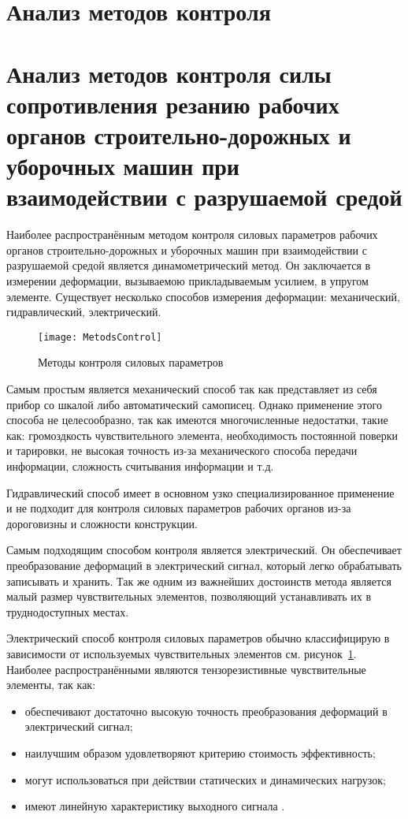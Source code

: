 \section{Анализ методов контроля}
\section{Анализ методов контроля силы сопротивления резанию рабочих органов строительно-дорожных и уборочных машин при взаимодействии с разрушаемой средой}
Наиболее распространённым методом контроля силовых параметров рабочих органов строительно-дорожных и уборочных машин при взаимодействии с разрушаемой средой является динамометрический метод. Он заключается в измерении деформации, вызываемою прикладываемым усилием, в упругом элементе. Существует несколько способов измерения деформации: механический, гидравлический, электрический.
\begin{figure}[ht] 
	\center
	\texttt{[image: MetodsControl]}
	\caption{Методы контроля силовых параметров} 
	\label{img:MetodsControl}  
\end{figure}

Самым простым является механический способ так как представляет из себя прибор со шкалой либо автоматический самописец. Однако применение этого способа не целесообразно, так как имеются многочисленные недостатки, такие как: громоздкость чувствительного элемента, необходимость постоянной поверки и тарировки, не высокая точность из-за механического способа передачи информации, сложность считывания информации и т.д.

Гидравлический способ имеет в основном узко специализированное применение и не подходит для контроля силовых параметров рабочих органов из-за дороговизны и сложности конструкции.

Самым подходящим способом контроля является электрический. Он обеспечивает преобразование деформаций в электрический сигнал, который легко обрабатывать записывать и хранить. Так же одним из важнейших достоинств метода является малый размер чувствительных элементов, позволяющий устанавливать их в труднодоступных местах.

Электрический способ контроля силовых параметров обычно классифицирую в зависимости от используемых чувствительных элементов см. рисунок~\ref{img:MetodsControl}. Наиболее распространёнными являются тензорезистивные чувствительные элементы, так как:
\begin{itemize}
	\item обеспечивают достаточно высокую точность преобразования деформаций в электрический сигнал;
	\item наилучшим образом удовлетворяют критерию стоимость эффективность;
	\item могут использоваться при действии статических и динамических нагрузок;
	\item имеют линейную характеристику выходного сигнала \todo{[91]}.
\end{itemize}

